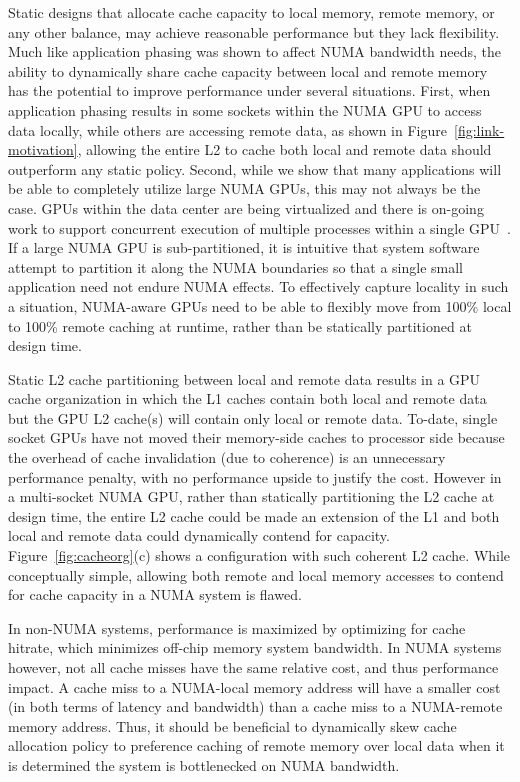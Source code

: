 Static designs that allocate cache capacity to local memory, remote memory, 
or any other balance, may achieve reasonable performance but they lack 
flexibility. Much like application phasing was shown to affect NUMA bandwidth 
needs, the ability to dynamically share cache capacity between local and 
remote memory has the potential to improve performance under several 
situations. First, when application phasing results in some sockets within 
the NUMA GPU to access data locally, while others are accessing remote data, 
as shown in Figure~\ref{fig:link-motivation}, allowing the entire L2 to cache 
both local and remote data should outperform any static policy. Second, while 
we show that many applications will be able to completely utilize large 
NUMA GPUs, this may not always be the case. GPUs within the data center are 
being virtualized and there is on-going work to support concurrent execution 
of multiple processes within a single GPU~\cite{park2015chimera, 
lin2016enabling}. If a large NUMA GPU is sub-partitioned, it is intuitive 
that system software attempt to partition it along the NUMA boundaries so 
that a single small application need not endure NUMA effects. To effectively 
capture locality in such a situation, NUMA-aware GPUs need to be able to 
flexibly move from 100\% local to 100\% remote caching at runtime, rather 
than be statically partitioned at design time. 

Static L2 cache partitioning between local and remote data results in a GPU 
cache organization in which the L1 caches contain both local and remote data 
but the GPU L2 cache(s) will contain only local or remote data.  To-date, 
single socket GPUs have not moved their memory-side caches to processor side 
because the overhead of cache invalidation (due to coherence) is an 
unnecessary performance penalty, with no performance upside to justify the 
cost. However in a multi-socket NUMA GPU, rather than statically 
partitioning the L2 cache at design time, the entire L2 cache could be made 
an extension of the L1 and both local and remote data could dynamically 
contend for capacity. Figure~\ref{fig:cacheorg}(c) shows a configuration with 
such coherent L2 cache. While conceptually simple, allowing both remote and 
local memory accesses to contend for cache capacity in a NUMA system is flawed.

In non-NUMA systems, performance is maximized by optimizing for cache 
hitrate, which minimizes off-chip memory system bandwidth. In NUMA systems 
however, not all cache misses have the same relative cost, and thus 
performance impact. A cache miss to a NUMA-local memory address will have a 
smaller cost (in both terms of latency and bandwidth) than a cache miss to a 
NUMA-remote memory address. Thus, it should be beneficial to dynamically 
skew cache allocation policy to preference caching of remote memory over 
local data when it is determined the system is bottlenecked on NUMA bandwidth.

